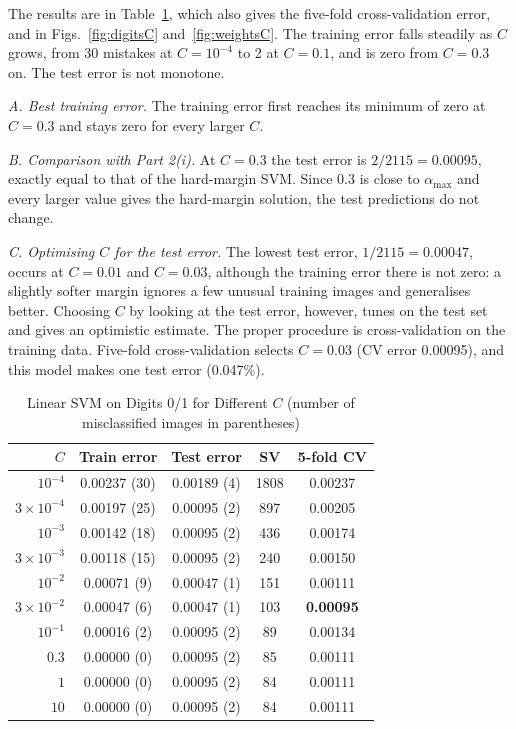 \documentclass[conference,a4paper]{IEEEtran}
\begin{document}
The results are in Table~\ref{tab:digitsC}, which also gives the five-fold cross-validation error, and in Figs.~\ref{fig:digitsC}
and~\ref{fig:weightsC}. The training error
falls steadily as $C$ grows, from 30 mistakes at $C=10^{-4}$ to 2 at $C=0.1$, and is zero from $C=0.3$ on. The test error is not
monotone.

\emph{A. Best training error.} The training error first reaches its minimum of zero at $C=0.3$ and stays zero for every larger $C$.

\emph{B. Comparison with Part 2(i).} At $C=0.3$ the test error is $2/2115=0.00095$, exactly equal to that of the hard-margin SVM. Since
$0.3$ is close to $\alpha_{\max}$ and every larger value gives the hard-margin solution, the test predictions do not change.

\emph{C. Optimising $C$ for the test error.} The lowest test error, $1/2115=0.00047$, occurs at $C=0.01$ and $C=0.03$, although the training
error there is not zero: a slightly softer margin ignores a few unusual training images and generalises better. Choosing $C$ by looking at the test
error, however, tunes on the test set and gives an optimistic estimate. The proper procedure is cross-validation on the training data.
Five-fold cross-validation selects $C=0.03$ (CV error 0.00095), and this model makes one test error (0.047\%).

\begin{table}[!t]
\caption{Linear SVM on Digits 0/1 for Different $C$ (number of misclassified images in parentheses)}
\label{tab:digitsC}
\centering
\small
\setlength{\tabcolsep}{3pt}
\begin{tabular}{@{}rcccc@{}}
\toprule
$C$ & Train error & Test error & SV & 5-fold CV\\
\midrule
$10^{-4}$ & 0.00237 (30) & 0.00189 (4) & 1808 & 0.00237\\
$3\times10^{-4}$ & 0.00197 (25) & 0.00095 (2) & 897 & 0.00205\\
$10^{-3}$ & 0.00142 (18) & 0.00095 (2) & 436 & 0.00174\\
$3\times10^{-3}$ & 0.00118 (15) & 0.00095 (2) & 240 & 0.00150\\
$10^{-2}$ & 0.00071 (9) & 0.00047 (1) & 151 & 0.00111\\
$3\times10^{-2}$ & 0.00047 (6) & 0.00047 (1) & 103 & \textbf{0.00095}\\
$10^{-1}$ & 0.00016 (2) & 0.00095 (2) & 89 & 0.00134\\
$0.3$ & 0.00000 (0) & 0.00095 (2) & 85 & 0.00111\\
$1$ & 0.00000 (0) & 0.00095 (2) & 84 & 0.00111\\
$10$ & 0.00000 (0) & 0.00095 (2) & 84 & 0.00111\\
\bottomrule
\end{tabular}
\end{table}
\end{document}
